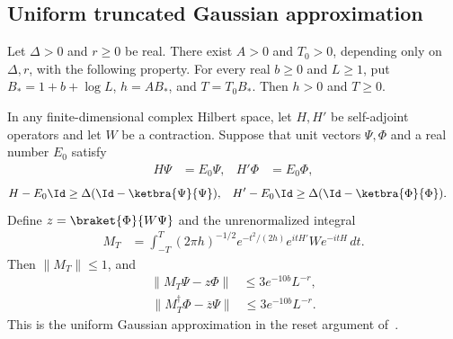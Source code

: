 \subsection{Uniform truncated Gaussian approximation}
\label{sec:gaussian_uniform_ground}


\begin{theorem}
    \label{thm:gaussian_uniform_ground}
    \leanok
    Let $\Delta>0$ and $r\ge0$ be real. There exist $A>0$ and $T_0>0$,
    depending only on $\Delta,r$, with the following property. For every
    real $b\ge0$ and $L\ge1$, put $B_*=1+b+\log L$, $h=AB_*$, and
    $T=T_0B_*$. Then $h>0$ and $T\ge0$.

    In any finite-dimensional complex Hilbert space, let $H,H'$ be
    self-adjoint operators and let $W$ be a contraction. Suppose that
    unit vectors $\Psi,\Phi$ and a real number $E_0$ satisfy
    \begin{align}
        H\Psi&=E_0\Psi,& H'\Phi&=E_0\Phi,
        \label{eq:gaussian_uniform_ground_vectors}
    \end{align}
    \begin{align}
        H-E_0\Id&\ge\Delta(\Id-\ketbra{\Psi}{\Psi}),&
        H'-E_0\Id&\ge\Delta(\Id-\ketbra{\Phi}{\Phi}).
        \label{eq:gaussian_uniform_ground_gaps}
    \end{align}
    Define $z=\braket{\Phi}{W\Psi}$ and the unrenormalized integral
    \begin{align}
        M_T&=\int_{-T}^{T}(2\pi h)^{-1/2}e^{-t^2/(2h)}
            e^{itH'}W e^{-itH}\,dt.
        \label{eq:gaussian_uniform_ground_integral}
    \end{align}
    Then $\|M_T\|\le1$, and
    \begin{align}
        \|M_T\Psi-z\Phi\|&\le3e^{-10b}L^{-r},
        \label{eq:gaussian_uniform_ground_forward}
    \end{align}
    \begin{align}
        \|M_T^\dagger\Phi-\overline z\Psi\|&\le3e^{-10b}L^{-r}.
        \label{eq:gaussian_uniform_ground_reverse}
    \end{align}
    This is the uniform Gaussian approximation in the reset argument
    of~\cite{OpenAI2026PolynomialPEPS}.
\end{theorem}
